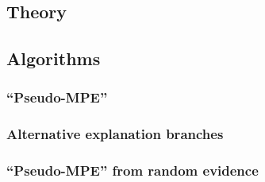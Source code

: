  
 
\subsection{Theory}


\subsection{Algorithms}
\subsubsection{\enquote{Pseudo-MPE}}
\subsubsection{Alternative explanation branches}
\subsubsection{\enquote{Pseudo-MPE} from random evidence}